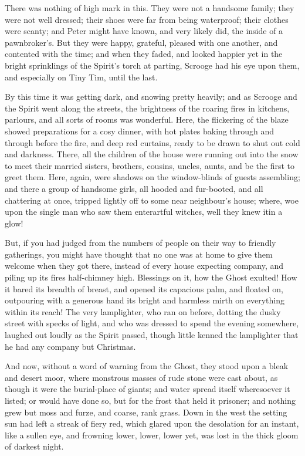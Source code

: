 \documentclass[paper=5.5in:8.5in,BCOR=10mm,twoside,DIV=15,12pt,usegeometry,openany]{scrbook} %
\begin{document}
There was nothing of high mark in this. They were not a handsome family; they were not well dressed; their shoes were far from being waterproof; their clothes were scanty; and Peter might have known, and very likely did, the inside of a pawnbroker's. But they were happy, grateful, pleased with one another, and contented with the time; and when they faded, and looked happier yet in the bright sprinklings of the Spirit's torch at parting, Scrooge had his eye upon them, and especially on Tiny Tim, until the last.

By this time it was getting dark, and snowing pretty heavily; and as Scrooge and the Spirit went along the streets, the brightness of the roaring fires in kitchens, parlours, and all sorts of rooms was wonderful. Here, the flickering of the blaze showed preparations for a cosy dinner, with hot plates baking through and through before the fire, and deep red curtains, ready to be drawn to shut out cold and darkness. There, all the children of the house were running out into the snow to meet their married sisters, brothers, cousins, uncles, aunts, and be the first to greet them. Here, again, were shadows on the window-blinds of guests assembling; and there a group of handsome girls, all hooded and fur-booted, and all chattering at once, tripped lightly off to some near neighbour's house; where, woe upon the single man who saw them enter\textemdash artful witches, well they knew it\textemdash in a glow!

But, if you had judged from the numbers of people on their way to friendly gatherings, you might have thought that no one was at home to give them welcome when they got there, instead of every house expecting company, and piling up its fires half-chimney high. Blessings on it, how the Ghost exulted! How it bared its breadth of breast, and opened its capacious palm, and floated on, outpouring with a generous hand its bright and harmless mirth on everything within its reach! The very lamplighter, who ran on before, dotting the dusky street with specks of light, and who was dressed to spend the evening somewhere, laughed out loudly as the Spirit passed, though little kenned the lamplighter that he had any company but Christmas.

And now, without a word of warning from the Ghost, they stood upon a bleak and desert moor, where monstrous masses of rude stone were cast about, as though it were the burial-place of giants; and water spread itself wheresoever it listed; or would have done so, but for the frost that held it prisoner; and nothing grew but moss and furze, and coarse, rank grass. Down in the west the setting sun had left a streak of fiery red, which glared upon the desolation for an instant, like a sullen eye, and frowning lower, lower, lower yet, was lost in the thick gloom of darkest night.
\end{document}
